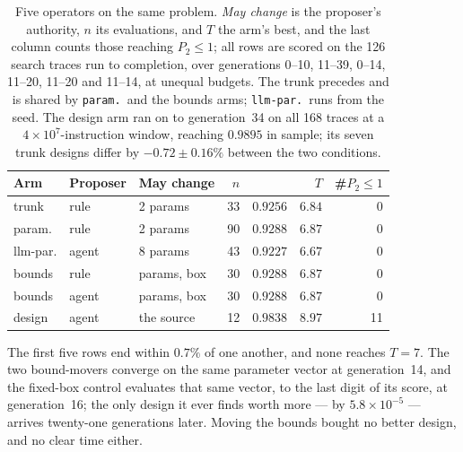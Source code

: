 \documentclass[conference]{IEEEtran}
\newcommand{\vfs}{\text{VFS}}
\begin{document}
\begin{table}[tb]
\caption{Five operators on the same problem. \emph{May
change} is the proposer's authority, $n$ its evaluations, \vfs{} and $T$ the
arm's best, and the last column counts those reaching $P_2\le1$; all rows are
scored on the 126 search traces run to completion, over generations 0--10,
11--39, 0--14, 11--20, 11--20 and 11--14, at unequal budgets. The trunk
precedes and is shared by \texttt{param.}\ and the bounds arms;
\texttt{llm-par.}\ runs from the seed. The design arm ran on to generation~34 on
all 168 traces at a $4\times10^7$-instruction window, reaching $0.9895$ in
sample; its seven trunk designs differ by $-0.72\pm0.16\%$ between the two
conditions.}
\label{tab:arms}
\centering\scriptsize
\begin{tabular}{@{}lllrrrr@{}}
\toprule
Arm & Proposer & May change & $n$ & \vfs{} & $T$ & \#$P_2\!\le\!1$ \\
\midrule
trunk    & rule  & 2 params    & 33 & $0.9256$ & $6.84$ & 0 \\
param.   & rule  & 2 params    & 90 & $0.9288$ & $6.87$ & 0 \\
llm-par. & agent & 8 params    & 43 & $0.9227$ & $6.67$ & 0 \\
bounds   & rule  & params, box & 30 & $0.9288$ & $6.87$ & 0 \\
bounds   & agent & params, box & 30 & $0.9288$ & $6.87$ & 0 \\
design   & agent & the source  & 12 & $0.9838$ & $8.97$ & 11 \\
\bottomrule
\end{tabular}
\end{table}

The first five rows end within $0.7\%$ of one another, and none reaches $T=7$.
The two bound-movers converge on the same parameter vector at generation~14, and
the fixed-box control evaluates that same vector, to the last digit of its
score, at generation~16; the only design it ever finds worth more --- by
$5.8\times10^{-5}$ --- arrives twenty-one generations later. Moving the bounds
bought no better design, and no clear time either.
\end{document}
